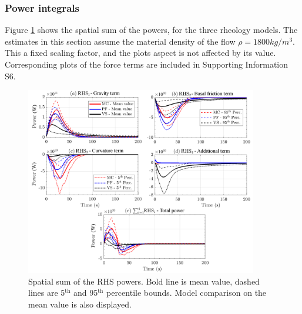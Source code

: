 \documentclass{article}
\begin{document}
\subsubsection{Power integrals}
Figure \ref{fig:Colima-Power-spatial} shows the spatial sum of the powers, for the three rheology models. The estimates in this section assume the material density of the flow $\rho = 1800 kg/m^3$. This a fixed scaling factor, and the plots aspect is not affected by its value. Corresponding plots of the force terms are included in Supporting Information S6. 
\begin{figure}[H]
        \centering
        \includegraphics[width=0.9\textwidth]{BAF_VolcanDeColima/AveragedMeasurments/PowersColima.png}
        \caption{Spatial sum of the RHS powers. Bold line is mean value, dashed lines are 5$^{\mathrm{th}}$ and 95$^{\mathrm{th}}$ percentile bounds. Model comparison on the mean value is also displayed.}
        \label{fig:Colima-Power-spatial}
\end{figure}
\end{document}
